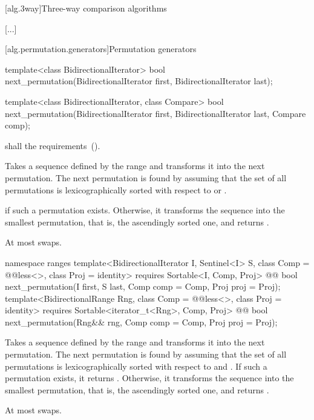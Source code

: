 [alg.3way]{Three-way comparison algorithms}

[...]

[alg.permutation.generators]{Permutation generators}

%
\begin{itemdecl}
template<class BidirectionalIterator>
  bool next_permutation(BidirectionalIterator first,
                        BidirectionalIterator last);

template<class BidirectionalIterator, class Compare>
  bool next_permutation(BidirectionalIterator first,
                        BidirectionalIterator last, Compare comp);
\end{itemdecl}

\begin{itemdescr}
\pnum
\requires
{} shall   the
 requirements~().

\pnum
\effects
Takes a sequence defined by the range
and transforms it into the next permutation.
The next permutation is found by assuming that the set of all permutations is
lexicographically sorted with respect to
or .

\pnum
\returns
{}
if such a permutation exists.
Otherwise, it transforms the sequence into the smallest permutation,
that is, the ascendingly sorted one, and returns
.

\pnum
\complexity
At most
swaps.
\end{itemdescr}

\begin{addedblock}
%
\begin{itemdecl}
namespace ranges {
  template<BidirectionalIterator I, Sentinel<I> S, class Comp = @@less<>,
      class Proj = identity>
    requires Sortable<I, Comp, Proj>
    @@ bool
      next_permutation(I first, S last, Comp comp = Comp{}, Proj proj = Proj{});
  template<BidirectionalRange Rng, class Comp = @@less<>,
      class Proj = identity>
    requires Sortable<iterator_t<Rng>, Comp, Proj>
    @@ bool
      next_permutation(Rng&& rng, Comp comp = Comp{}, Proj proj = Proj{});
}
\end{itemdecl}

\begin{itemdescr}
\pnum
\effects
Takes a sequence defined by the range
and transforms it into the next permutation.
The next permutation is found by assuming that the set of all permutations is
lexicographically sorted with respect to
 and .
If such a permutation exists, it returns
.
Otherwise, it transforms the sequence into the smallest permutation,
that is, the ascendingly sorted one, and returns
.

\pnum
\complexity
At most
swaps.
\end{itemdescr}
\end{addedblock}

